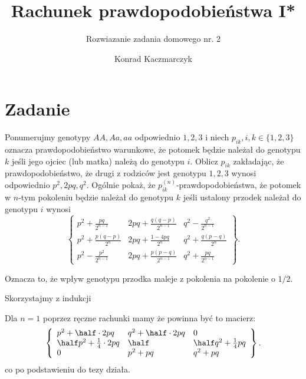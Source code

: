 \documentclass[11pt]{scrartcl}
\author{Konrad Kaczmarczyk}
\begin{document}
    \title{Rachunek prawdopodobieństwa I*}
    \subtitle{Rozwiazanie zadania domowego nr. 2}
    \maketitle

    \section{Zadanie}

    \begin{zadanie*}
        Ponumerujmy genotypy \( AA, Aa, aa \) odpowiednio \( 1,2,3 \) 
        i niech \( p_{ik}, i,k \in \{1,2,3\} \) oznacza prawdopodobieństwo warunkowe, 
        że potomek będzie należał do genotypu \( k \) jeśli jego ojciec (lub matka) 
        należą do genotypu \( i \). Oblicz \( p_{ik} \) zakładając, że prawdopodobieństwo, 
        że drugi z rodziców jest genotypu \( 1,2,3 \) wynosi odpowiednio 
        \( p^2, 2pq, q^2 \). Ogólnie pokaż, że \( p_{ik}^{(n)} \)-prawdopodobieństwa, 
        że potomek w \( n \)-tym pokoleniu będzie należał do genotypu \( k \) 
        jeśli ustalony przodek należał do genotypu \( i \) wynosi
        \[
        \left\{
            \begin{array}{lll}
                p^2 + \frac{pq}{2^{n-1}} & 2pq + \frac{q(q-p)}{2^{n-1}} & q^2 - \frac{q^2}{2^{n-1}} \\
                p^2 + \frac{p(q-p)}{2^n} & 2pq + \frac{1 - 4pq}{2^n} & q^2 + \frac{q(p-q)}{2^n} \\
                p^2 - \frac{p^2}{2^{n-1}} & 2pq + \frac{p(p - q)}{2^{n-1}} & q^2 + \frac{pq}{2^{n-1}}
            \end{array}
        \right\}.
        \]

        Oznacza to, że wpływ genotypu przodka maleje z pokolenia na pokolenie o \( 1/2 \).
    \end{zadanie*}

    Skorzystajmy z indukcji

    Dla $n = 1$ poprzez ręczne rachunki mamy że powinna być to macierz:
    \[
        \left\{
            \begin{array}{lll}
                p^2 + \half \cdot 2pq & q^2 + \half \cdot 2pq & 0 \\
                \half p^2 + \frac{1}{4} \cdot 2pq & \half & \half q^2 + \frac{1}{4} pq \\
                0 & p^2 + pq & q^2 + pq
            \end{array}
        \right\}.
    \]
    co po podstawieniu do tezy działa.  
\end{document}
